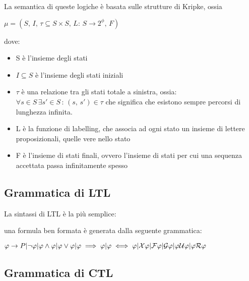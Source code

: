 \begin{center}  \end{center}

La semantica di queste logiche è basata sulle strutture di Kripke,
ossia 

$\mu=(S,\, I,\,\tau\subseteq S\times S,\, L:\, S\longrightarrow2^{\phi},\, F)$

dove:
\begin{itemize}
\item S è l'insieme degli stati
\item $I\subseteq S$ è l'insieme degli stati iniziali
\item $\tau$ è una relazione tra gli stati totale a sinistra, ossia: $\forall s\in S\,\exists s'\in S\,:\,(s,\, s')\in\tau$
che significa che esistono sempre percorsi di lunghezza infinita.
\item L è la funzione di labelling, che associa ad ogni stato un insieme
di lettere proposizionali, quelle vere nello stato
\item F è l'insieme di stati finali, ovvero l'insieme di stati per cui una
sequenza accettata passa infinitamente spesso
\end{itemize}

\subsection{Grammatica di LTL}

La sintassi di LTL è la più semplice:

una formula ben formata è generata dalla seguente grammatica:

$\varphi\rightarrow P|\neg\varphi|\varphi\wedge\varphi|\varphi\vee\varphi|\varphi\implies\varphi|\varphi\iff\varphi|\mathcal{X}\varphi|\mathcal{F}\varphi|\mathcal{G}\varphi|\varphi\mathcal{U}\varphi|\varphi\mathcal{R}\varphi$


\subsection{Grammatica di CTL}

